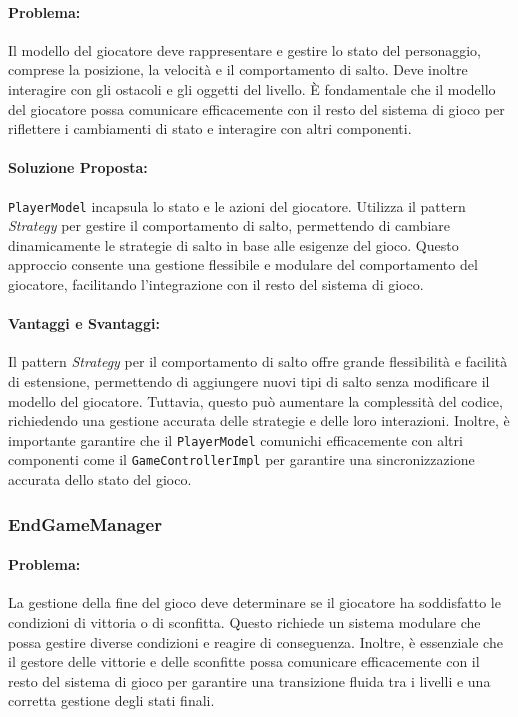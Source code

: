 \documentclass[a4paper,12pt]{report}
\begin{document}
\paragraph{Problema:} Il modello del giocatore deve rappresentare e gestire lo stato del personaggio, comprese la posizione, la velocità e il comportamento di salto. Deve inoltre interagire con gli ostacoli e gli oggetti del livello. È fondamentale che il modello del giocatore possa comunicare efficacemente con il resto del sistema di gioco per riflettere i cambiamenti di stato e interagire con altri componenti.

\paragraph{Soluzione Proposta:} \texttt{PlayerModel} incapsula lo stato e le azioni del giocatore. Utilizza il pattern \textit{Strategy} per gestire il comportamento di salto, permettendo di cambiare dinamicamente le strategie di salto in base alle esigenze del gioco. Questo approccio consente una gestione flessibile e modulare del comportamento del giocatore, facilitando l'integrazione con il resto del sistema di gioco.

\paragraph{Vantaggi e Svantaggi:} 
Il pattern \textit{Strategy} per il comportamento di salto offre grande flessibilità e facilità di estensione, permettendo di aggiungere nuovi tipi di salto senza modificare il modello del giocatore. Tuttavia, questo può aumentare la complessità del codice, richiedendo una gestione accurata delle strategie e delle loro interazioni. Inoltre, è importante garantire che il \texttt{PlayerModel} comunichi efficacemente con altri componenti come il \texttt{GameControllerImpl} per garantire una sincronizzazione accurata dello stato del gioco.

\subsubsection{EndGameManager}

\paragraph{Problema:} La gestione della fine del gioco deve determinare se il giocatore ha soddisfatto le condizioni di vittoria o di sconfitta. Questo richiede un sistema modulare che possa gestire diverse condizioni e reagire di conseguenza. Inoltre, è essenziale che il gestore delle vittorie e delle sconfitte possa comunicare efficacemente con il resto del sistema di gioco per garantire una transizione fluida tra i livelli e una corretta gestione degli stati finali.
\end{document}
